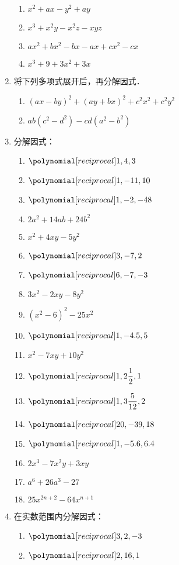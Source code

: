 \begin{enumerate}
\begin{multicols}{2}
\begin{enumerate}
    \item $x^2+ax-y^2+ay$
    \item $x^3+x^2y-x^2z-xyz$
    \item $ax^2+bx^2-bx-ax+cx^2-cx$
    \item $x^3+9+3x^2+3x$
\end{enumerate}
\end{multicols}
    \item 将下列多项式展开后，再分解因式．
\begin{enumerate}
    \item $(ax-by)^2+(ay+bx)^2+c^2x^2+c^2y^2$
    \item $ab(c^2-d^2)-cd(a^2-b^2)$
\end{enumerate}
    \item 分解因式：
\begin{multicols}{2}
\begin{enumerate}
    \item $\poly{1,4,3}$
    \item $\poly{1,-11,10}$
    \item $\poly{1,-2,-48}$
    \item $2a^2+14ab+24b^2$
    \item $x^2+4xy-5y^2$
    \item $\poly{3,-7,2}$
    \item $\poly{6,-7,-3}$
    \item $3x^2 − 2xy − 8y^2$
    \item $(x^2-6)^2-25x^2$
    \item $\poly{1,-4.5,5}$
    \item $x^2 −7xy+10y^2$
    \item $\poly{1,2\frac{1}{2},1}$
    \item $\poly{1,3\frac{5}{12},2}$
    \item $\poly{20,-39,18}$
    \item $\poly{1,-5.6,6.4}$
    \item $2x^3 − 7x^2y + 3xy$
    \item $a^6+26a^3-27$
    \item $25x^{2n+2}-64x^{n+1}$
\end{enumerate}
\end{multicols}
    \item 在实数范围内分解因式：
    \begin{multicols}{2}
    \begin{enumerate}
        \item $\poly{3,2,-3}$
        \item $\poly{2,16,1}$

\end{enumerate}
\end{multicols}
\end{enumerate}
